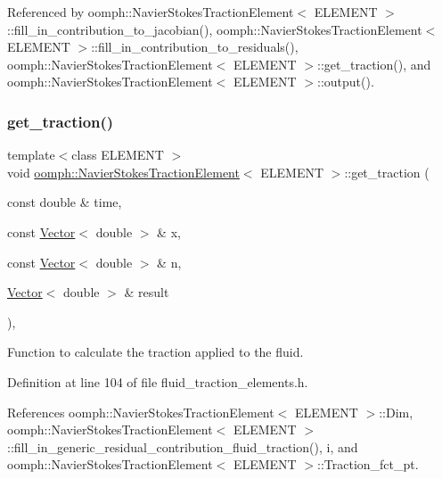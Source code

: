Referenced by oomph\+::\+Navier\+Stokes\+Traction\+Element$<$ E\+L\+E\+M\+E\+N\+T $>$\+::fill\+\_\+in\+\_\+contribution\+\_\+to\+\_\+jacobian(), oomph\+::\+Navier\+Stokes\+Traction\+Element$<$ E\+L\+E\+M\+E\+N\+T $>$\+::fill\+\_\+in\+\_\+contribution\+\_\+to\+\_\+residuals(), oomph\+::\+Navier\+Stokes\+Traction\+Element$<$ E\+L\+E\+M\+E\+N\+T $>$\+::get\+\_\+traction(), and oomph\+::\+Navier\+Stokes\+Traction\+Element$<$ E\+L\+E\+M\+E\+N\+T $>$\+::output().

\mbox{\label{classoomph_1_1NavierStokesTractionElement_ab5b0454a2b29fc69938235af430702bf}} 
\subsubsection{\texorpdfstring{get\+\_\+traction()}{get\_traction()}}
{\footnotesize\ttfamily template$<$class E\+L\+E\+M\+E\+NT $>$ \\
void \hyperlink{classoomph_1_1NavierStokesTractionElement}{oomph\+::\+Navier\+Stokes\+Traction\+Element}$<$ E\+L\+E\+M\+E\+NT $>$\+::get\+\_\+traction (\begin{DoxyParamCaption}\item[{const double \&}]{time,  }\item[{const \hyperlink{classoomph_1_1Vector}{Vector}$<$ double $>$ \&}]{x,  }\item[{const \hyperlink{classoomph_1_1Vector}{Vector}$<$ double $>$ \&}]{n,  }\item[{\hyperlink{classoomph_1_1Vector}{Vector}$<$ double $>$ \&}]{result }\end{DoxyParamCaption})\hspace{0.3cm}{\ttfamily [inline]}, {\ttfamily [protected]}}



Function to calculate the traction applied to the fluid. 



Definition at line 104 of file fluid\+\_\+traction\+\_\+elements.\+h.



References oomph\+::\+Navier\+Stokes\+Traction\+Element$<$ E\+L\+E\+M\+E\+N\+T $>$\+::\+Dim, oomph\+::\+Navier\+Stokes\+Traction\+Element$<$ E\+L\+E\+M\+E\+N\+T $>$\+::fill\+\_\+in\+\_\+generic\+\_\+residual\+\_\+contribution\+\_\+fluid\+\_\+traction(), i, and oomph\+::\+Navier\+Stokes\+Traction\+Element$<$ E\+L\+E\+M\+E\+N\+T $>$\+::\+Traction\+\_\+fct\+\_\+pt.



